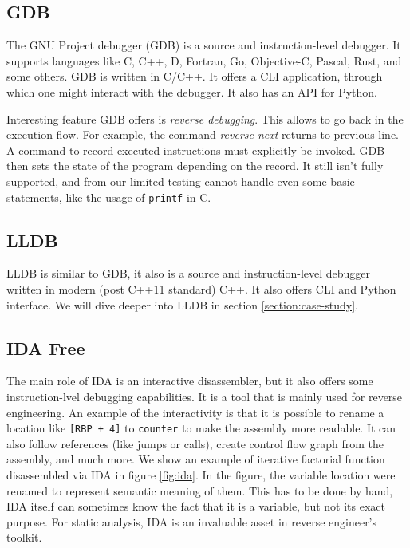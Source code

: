 \subsection{GDB}
The GNU Project debugger (GDB) \cite{gdb-manual} is a source and instruction-level
debugger. It supports languages like C, C++, D, Fortran, Go, Objective-C,
Pascal, Rust, and some others. GDB is written in C/C++. It offers a CLI
application, through which one might interact with the debugger. It also
has an API for Python.

Interesting feature GDB offers is \textit{reverse debugging}. This allows to go
back in the execution flow. For example, the command \textit{reverse-next}
returns to previous line. A command to record executed instructions must
explicitly be invoked. GDB then sets the state of the program depending on the
record. It still isn't fully supported, and from our limited testing cannot
handle even some basic statements, like the usage of \texttt{printf} in C.

\subsection{LLDB}
LLDB is similar to GDB, it also is a source and instruction-level debugger
written in modern (post C++11 standard) C++. It also offers CLI and Python
interface. We will dive deeper into LLDB in section \ref{section:case-study}.

\subsection{IDA Free}
The main role of IDA is an interactive disassembler, but it also offers some
instruction-lvel debugging capabilities. It is a tool that is mainly used for
reverse engineering. An example of the interactivity is that it is possible to
rename a location like \texttt{[RBP + 4]} to \texttt{counter} to make the
assembly more readable. It can also follow references (like jumps or calls),
create control flow graph from the assembly, and much more. We show an example
of iterative factorial function disassembled via IDA in figure \ref{fig:ida}.
In the figure, the variable location were renamed to represent semantic meaning
of them. This has to be done by hand, IDA itself can sometimes know the fact
that it is a variable, but not its exact purpose. For static analysis, IDA is
an invaluable asset in reverse engineer's toolkit.

